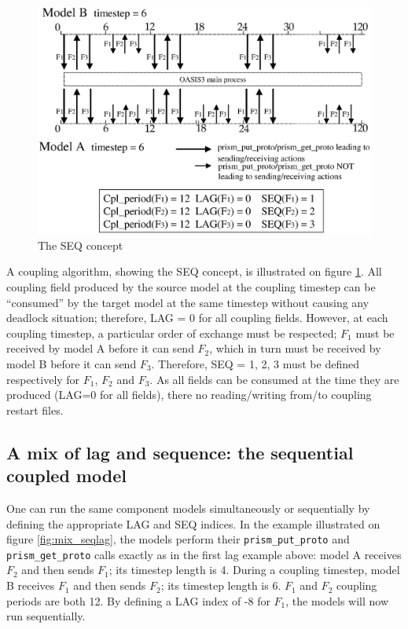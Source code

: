 \begin{figure}
\includegraphics[scale=.6]{fig_seq_concept.eps} 
\caption{The SEQ concept}
\label{fig:seq_concept}
\end{figure}

A coupling algorithm, showing the SEQ concept, is illustrated on
figure \ref{fig:seq_concept}. All coupling field produced by the
source model at the coupling timestep can be ``consumed'' by the
target model at the same timestep without causing any
deadlock situation; therefore, LAG = 0 for all coupling fields.
However, at each coupling timestep, a particular order
of exchange must be respected; $F_1$ must be received by
model A before it can send $F_2$, which in turn must be received by model B
before it can send $F_3$. Therefore, SEQ = 1, 2, 3 must be defined
respectively for $F_1$, $F_2$ and $F_3$. 
As all fields can be consumed at the time they are produced (LAG=0 for
all fields), there no reading/writing from/to coupling restart files.

\subsection{A mix of lag and sequence: the sequential coupled model}
\label{subsubsec_mix}

One can run the same component models simultaneously or sequentially
by defining the appropriate LAG and SEQ indices. In the example
illustrated on figure \ref{fig:mix_seqlag}, the models perform their
{\tt prism\_put\_proto} and {\tt prism\_get\_proto} calls exactly as
in the first lag example above: model A receives $F_2$ and then sends
$F_1$; its timestep length is 4. During a coupling timestep, model B
receives $F_1$ and then sends $F_2$; its timestep length is 6.  $F_1$
and $F_2$ coupling periods are both 12. By defining a LAG index of -8
for $F_1$, the models will now run sequentially.

